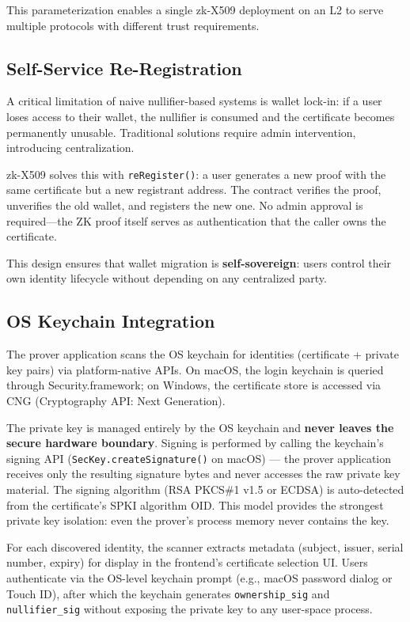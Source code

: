 \documentclass[11pt, a4paper]{article}
\begin{document}
This parameterization enables a single zk-X509 deployment on an L2 to
serve multiple protocols with different trust requirements.

\subsection{Self-Service
Re-Registration}\label{self-service-re-registration}

A critical limitation of naive nullifier-based systems is wallet
lock-in: if a user loses access to their wallet, the nullifier is
consumed and the certificate becomes permanently unusable. Traditional
solutions require admin intervention, introducing centralization.

zk-X509 solves this with \texttt{reRegister()}: a user generates a new
proof with the same certificate but a new registrant address. The
contract verifies the proof, unverifies the old wallet, and registers
the new one. No admin approval is required---the ZK proof itself serves
as authentication that the caller owns the certificate.

This design ensures that wallet migration is \textbf{self-sovereign}:
users control their own identity lifecycle without depending on any
centralized party.

\subsection{OS Keychain
Integration}\label{os-keychain-integration}

The prover application scans the OS keychain for identities (certificate +
private key pairs) via platform-native APIs. On macOS, the login
keychain is queried through Security.framework; on Windows, the
certificate store is accessed via CNG (Cryptography API: Next
Generation).

The private key is managed entirely by the OS keychain and \textbf{never
leaves the secure hardware boundary}. Signing is performed by calling
the keychain's signing API (\texttt{SecKey.createSignature()} on macOS)
--- the prover application receives only the resulting signature bytes and
never accesses the raw private key material. The signing algorithm (RSA
PKCS\#1 v1.5 or ECDSA) is auto-detected from the certificate's SPKI
algorithm OID. This model provides the strongest private key isolation:
even the prover's process memory never contains the key.

For each discovered identity, the scanner extracts metadata (subject,
issuer, serial number, expiry) for display in the frontend's certificate
selection UI. Users authenticate via the OS-level keychain prompt (e.g.,
macOS password dialog or Touch ID), after which the keychain generates
\texttt{ownership\_sig} and \texttt{nullifier\_sig} without exposing the
private key to any user-space process.
\end{document}
